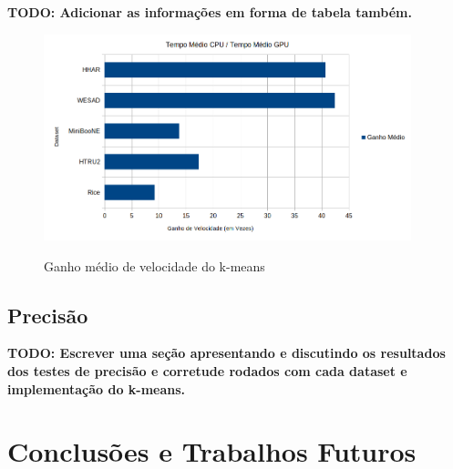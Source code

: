 \documentclass[12pt,
openright, 
oneside, %
a4paper,    %
brazil]{facom-ufu-abntex2}
\begin{document}
\textbf{TODO: Adicionar as informações em forma de tabela também.}

\begin{figure}[h]
  \caption{Ganho médio de velocidade do k-means}
  \centering
  \includegraphics[width=0.95\textwidth]{kMeansAvgSpeedup.png}
  \label{fig:kMeansAvgSpeedup}
\end{figure}





\section{Precisão}
\label{sec:testesDePrecisao}


\textbf{TODO: Escrever uma seção apresentando e discutindo os resultados dos testes de precisão e corretude rodados com cada dataset e implementação do k-means.}






\chapter{Conclusões e Trabalhos Futuros}

\end{document}
